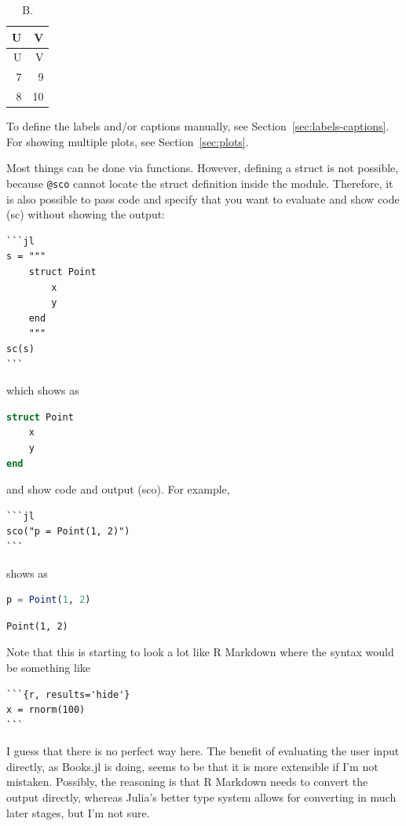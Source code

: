 \documentclass[
  notoc %
]{tufte-book}
\newcommand{\passthrough}[1]{#1}
\begin{document}
\hypertarget{tbl:b}{}
\begin{longtable}[]{@{}rr@{}}
\caption{\label{tbl:b}B.}\tabularnewline
\toprule
U & V \\
\midrule
\endfirsthead
\toprule
U & V \\
\midrule
\endhead
7 & 9 \\
8 & 10 \\
\bottomrule
\end{longtable}

To define the labels and/or captions manually, see
Section~\ref{sec:labels-captions}. For showing multiple plots, see
Section~\ref{sec:plots}.

Most things can be done via functions. However, defining a struct is not
possible, because \passthrough{\lstinline!@sco!} cannot locate the
struct definition inside the module. Therefore, it is also possible to
pass code and specify that you want to evaluate and show code (sc)
without showing the output:

\begin{lstlisting}
```jl
s = """
    struct Point
        x
        y
    end
    """
sc(s)
```
\end{lstlisting}

which shows as

\begin{lstlisting}[language=Julia]
struct Point
    x
    y
end
\end{lstlisting}

and show code and output (sco). For example,

\begin{lstlisting}
```jl
sco("p = Point(1, 2)")
```
\end{lstlisting}

shows as

\begin{lstlisting}[language=Julia]
p = Point(1, 2)
\end{lstlisting}

\begin{lstlisting}[language=Output]
Point(1, 2)
\end{lstlisting}

Note that this is starting to look a lot like R Markdown where the
syntax would be something like

\begin{lstlisting}
```{r, results='hide'}
x = rnorm(100)
```
\end{lstlisting}

I guess that there is no perfect way here. The benefit of evaluating the
user input directly, as Books.jl is doing, seems to be that it is more
extensible if I'm not mistaken. Possibly, the reasoning is that R
Markdown needs to convert the output directly, whereas Julia's better
type system allows for converting in much later stages, but I'm not
sure.
\end{document}
